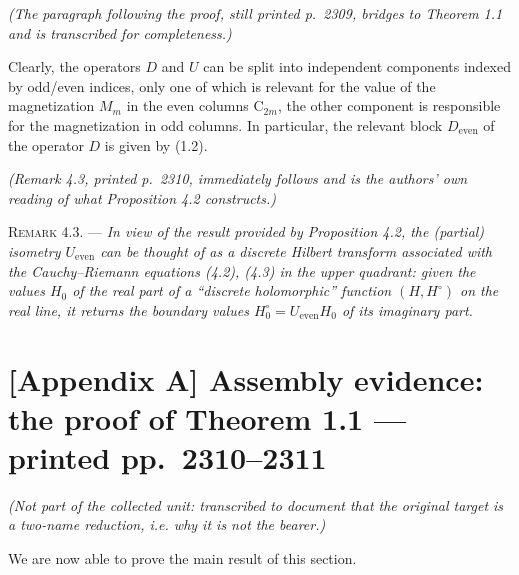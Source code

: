 \documentclass[11pt]{article}
\newcommand{\Dev}{D_{\mathrm{even}}}
\newcommand{\Uev}{U_{\mathrm{even}}}
\begin{document}
\medskip
\noindent\emph{(The paragraph following the proof, still printed p.~2309,
bridges to Theorem 1.1 and is transcribed for completeness.)}

Clearly, the operators $D$ and $U$ can be split into independent components
indexed by odd/even indices, only one of which is relevant for the value of
the magnetization $M_m$ in the even columns $\mathrm{C}_{2m}$, the other
component is responsible for the magnetization in odd columns. In particular,
the relevant block $\Dev$ of the operator $D$ is given by (1.2).

\medskip
\noindent\emph{(Remark 4.3, printed p.~2310, immediately follows and is the
authors' own reading of what Proposition 4.2 constructs.)}

\medskip
\noindent\textsc{Remark 4.3.} --- \emph{In view of the result provided by
Proposition 4.2, the (partial) isometry $\Uev$ can be thought of as a
\textup{discrete Hilbert transform} associated with the Cauchy--Riemann
equations (4.2), (4.3) in the upper quadrant: given the values $H_0$ of the
real part of a ``discrete holomorphic'' function $(H,H^{\circ})$ on the real
line, it returns the boundary values $H_0^{\circ} = \Uev H_0$ of its imaginary
part.}

\section*{[Appendix A] Assembly evidence: the proof of Theorem 1.1 --- printed pp.~2310--2311}

\noindent\emph{(Not part of the collected unit: transcribed to document that
the original target is a two-name reduction, i.e. why it is not the bearer.)}

\medskip
We are now able to prove the main result of this section.
\end{document}
